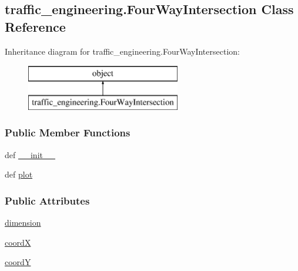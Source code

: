 \hypertarget{classtraffic__engineering_1_1FourWayIntersection}{\subsection{traffic\-\_\-engineering.\-Four\-Way\-Intersection Class Reference}
\label{classtraffic__engineering_1_1FourWayIntersection}
}
Inheritance diagram for traffic\-\_\-engineering.\-Four\-Way\-Intersection\-:\begin{figure}[H]
\begin{center}
\leavevmode
\includegraphics[height=2.000000cm]{classtraffic__engineering_1_1FourWayIntersection}
\end{center}
\end{figure}
\subsubsection*{Public Member Functions}
\begin{DoxyCompactItemize}
\item 
def \hyperlink{classtraffic__engineering_1_1FourWayIntersection_a689d2552e3b11345f7df40ecb82f3ffc}{\-\_\-\-\_\-init\-\_\-\-\_\-}
\item 
def \hyperlink{classtraffic__engineering_1_1FourWayIntersection_a7b83cbcc08c0e8ce00fe9db7efac988f}{plot}
\end{DoxyCompactItemize}
\subsubsection*{Public Attributes}
\begin{DoxyCompactItemize}
\item 
\hyperlink{classtraffic__engineering_1_1FourWayIntersection_a1eda03581ffad141eca9e1cea631ba6f}{dimension}
\item 
\hyperlink{classtraffic__engineering_1_1FourWayIntersection_a787284cf8c1dfa72c3ca408c0b467d9c}{coord\-X}
\item 
\hyperlink{classtraffic__engineering_1_1FourWayIntersection_a0b85dbf962f6d0ed264c33826be93888}{coord\-Y}
\end{DoxyCompactItemize}


